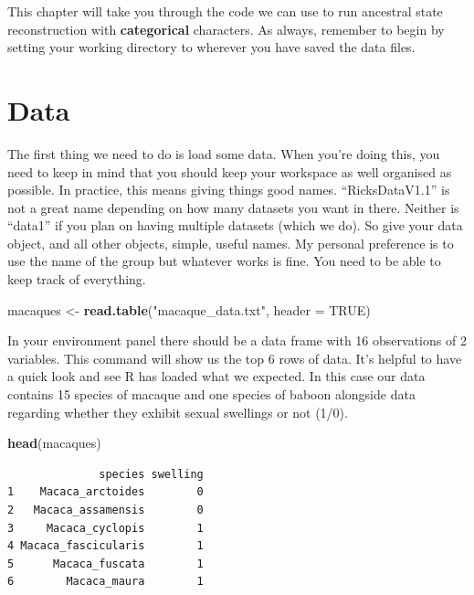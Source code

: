 \documentclass[
]{book}
\newenvironment{Shaded}{\begin{snugshade}}{\end{snugshade}}
\newcommand{\DataTypeTok}[1]{\textcolor[rgb]{0.13,0.29,0.53}{#1}}
\newcommand{\KeywordTok}[1]{\textcolor[rgb]{0.13,0.29,0.53}{\textbf{#1}}}
\newcommand{\NormalTok}[1]{#1}
\newcommand{\OtherTok}[1]{\textcolor[rgb]{0.56,0.35,0.01}{#1}}
\newcommand{\StringTok}[1]{\textcolor[rgb]{0.31,0.60,0.02}{#1}}
\begin{document}
This chapter will take you through the code we can use to run ancestral state reconstruction with \textbf{categorical} characters. As always, remember to begin by setting your working directory to wherever you have saved the data files.

\hypertarget{data-1}{%
\section{Data}\label{data-1}}

The first thing we need to do is load some data. When you're doing this, you need to keep in mind that you should keep your workspace as well organised as possible. In practice, this means giving things good names. ``RicksDataV1.1'' is not a great name depending on how many datasets you want in there. Neither is ``data1'' if you plan on having multiple datasets (which we do). So give your data object, and all other objects, simple, useful names. My personal preference is to use the name of the group but whatever works is fine. You need to be able to keep track of everything.

\begin{Shaded}
\begin{Highlighting}[]
\NormalTok{macaques \textless{}{-}}\StringTok{ }\KeywordTok{read.table}\NormalTok{(}\StringTok{"macaque\_data.txt"}\NormalTok{, }\DataTypeTok{header =} \OtherTok{TRUE}\NormalTok{)}
\end{Highlighting}
\end{Shaded}

In your environment panel there should be a data frame with 16 observations of 2 variables. This command will show us the top 6 rows of data. It's helpful to have a quick look and see R has loaded what we expected. In this case our data contains 15 species of macaque and one species of baboon alongside data regarding whether they exhibit sexual swellings or not (1/0).

\begin{Shaded}
\begin{Highlighting}[]
\KeywordTok{head}\NormalTok{(macaques)}
\end{Highlighting}
\end{Shaded}

\begin{verbatim}
              species swelling
1    Macaca_arctoides        0
2   Macaca_assamensis        0
3     Macaca_cyclopis        1
4 Macaca_fascicularis        1
5      Macaca_fuscata        1
6        Macaca_maura        1
\end{verbatim}
\end{document}
